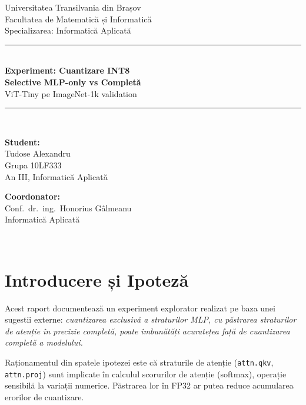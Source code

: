 \documentclass[12pt,a4paper]{article}
\begin{document}

\begin{titlepage}
  \centering
  {\large Universitatea Transilvania din Brașov\\}
  {\small Facultatea de Matematică și Informatică\\}
  {\small Specializarea: Informatică Aplicată\\[2cm]}

  \rule{\linewidth}{0.4pt}\\[0.5cm]
  {\LARGE\bfseries Experiment: Cuantizare INT8\\[0.3cm]}
  {\Large\bfseries Selective MLP-only vs Completă\\[0.2cm]}
  {\large ViT-Tiny pe ImageNet-1k validation}\\[0.3cm]
  \rule{\linewidth}{0.4pt}\\[2cm]

  \begin{minipage}{0.45\textwidth}
    \textbf{Student:}\\
    Tudose Alexandru\\
    Grupa 10LF333\\
    An III, Informatică Aplicată
  \end{minipage}
  \hfill
  \begin{minipage}{0.45\textwidth}
    \raggedleft
    \textbf{Coordonator:}\\
    Conf.\ dr.\ ing.\ Honorius Gâlmeanu\\
    Informatică Aplicată
  \end{minipage}\\[3cm]
\end{titlepage}

\tableofcontents
\newpage

\section{Introducere și Ipoteză}

Acest raport documentează un experiment explorator realizat pe baza unei
sugestii externe: \emph{cuantizarea exclusivă a straturilor MLP, cu
păstrarea straturilor de atenție în precizie completă, poate îmbunătăți
acuratețea față de cuantizarea completă a modelului.}

Raționamentul din spatele ipotezei este că straturile de atenție
(\texttt{attn.qkv}, \texttt{attn.proj}) sunt implicate în calculul
scorurilor de atenție (softmax), operație sensibilă la variații numerice.
Păstrarea lor în FP32 ar putea reduce acumularea erorilor de cuantizare.
\end{document}
